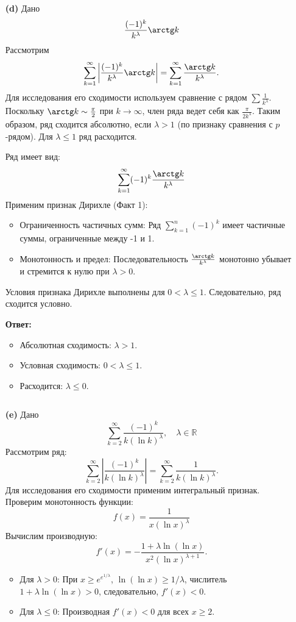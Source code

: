 \documentclass[a4paper]{article}
\renewcommand{\geq}{\geqslant}
\renewcommand{\leq}{\leqslant}
\begin{document}
\begin{enumerate}
\item[\textbf{(d)}]Дано
\[\frac{(-1)^k}{k^\lambda} \arctg k\]
Рассмотрим
\[
\sum_{k=1}^{\infty} \left| \frac{(-1)^k}{k^\lambda} \arctg k \right| = \sum_{k=1}^{\infty} \frac{\arctg k}{k^\lambda}.
\]
Для исследования его сходимости используем сравнение с рядом 
\( \sum \frac{1}{k^\lambda} \). Поскольку \( \arctg k \sim \frac{\pi}{2} \) 
при \( k \to \infty \), член ряда ведет себя как \( \frac{\pi}{2k^\lambda} \).
Таким образом, ряд сходится абсолютно, если \( \lambda > 1 \)
(по признаку сравнения с \( p \)-рядом). Для \( \lambda \leq 1 \) ряд расходится.

Ряд имеет вид:
\[
\sum_{k=1}^{\infty} (-1)^k \frac{\arctg k}{k^\lambda}
\]
Применим признак Дирихле (Факт 1):
\begin{itemize}
  \item Ограниченность частичных сумм: Ряд \( \sum_{k=1}^n (-1)^k \)
    имеет частичные суммы, ограниченные между -1 и 1.
  \item Монотонность и предел: Последовательность \( \frac{\arctg k}{k^\lambda} \)
    монотонно убывает и стремится к нулю при \( \lambda > 0 \).
\end{itemize}

Условия признака Дирихле выполнены для \( 0 < \lambda \leq 1 \). Следовательно, ряд сходится условно.

\textbf{Ответ: } 
\begin{itemize}
  \item Абсолютная сходимость: \( \lambda > 1 \).
  \item Условная сходимость: \( 0 < \lambda \leq 1 \).
  \item Расходится: \( \lambda \leq 0 \).
\end{itemize}$\;$

\item[\textbf{(e)}]Дано
\[
\sum_{k=2}^{\infty} \frac{(-1)^k}{k (\ln k)^\lambda}, \quad \lambda \in \mathbb{R}
\]
Рассмотрим ряд:
\[
\sum_{k=2}^{\infty} \left| \frac{(-1)^k}{k (\ln k)^\lambda} \right| = \sum_{k=2}^{\infty} \frac{1}{k (\ln k)^\lambda}.
\]
Для исследования его сходимости применим интегральный признак.
  Проверим монотонность функции:
\[
f(x) = \frac{1}{x (\ln x)^\lambda}
\]
Вычислим производную:
\[
f'(x) = -\frac{1 + \lambda \ln(\ln x)}{x^2 (\ln x)^{\lambda + 1}}.
\]
\begin{itemize}
  \item  Для \( \lambda > 0 \): При \( x \geq e^{e^{1/\lambda}} \), \( \ln(\ln x) \geq 1/\lambda \), числитель \( 1 + \lambda \ln(\ln x) > 0 \), следовательно, \( f'(x) < 0 \).
  \item  Для \( \lambda \leq 0 \): Производная \( f'(x) < 0 \) для всех \( x \geq 2 \).
\end{itemize}


\end{enumerate}
\end{document}
